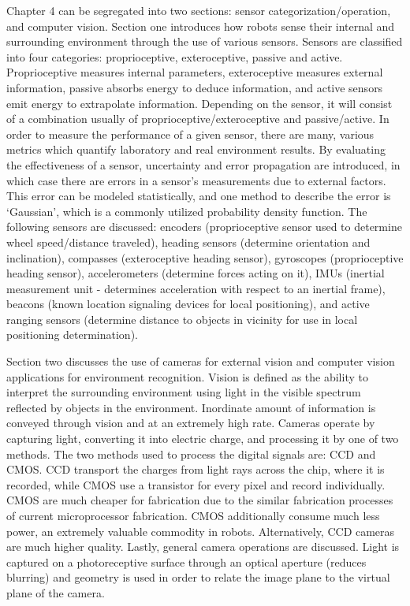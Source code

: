 Chapter 4 can be segregated into two sections: sensor categorization/operation, and computer vision. Section one introduces how robots sense their internal and surrounding environment through the use of various sensors. Sensors are classified into four categories: proprioceptive, exteroceptive, passive and active.  Proprioceptive measures internal parameters, exteroceptive measures external information, passive absorbs energy to deduce information, and active sensors emit energy to extrapolate information. Depending on the sensor, it will consist of a combination usually of proprioceptive/exteroceptive and passive/active. In order to measure the performance of a given sensor, there are many, various metrics which quantify laboratory and real environment results. By evaluating the effectiveness of a sensor, uncertainty and error propagation are introduced, in which case there are errors in a sensor’s measurements due to external factors. This error can be modeled statistically, and one method to describe the error is ‘Gaussian’, which is a commonly utilized probability density function. The following sensors are discussed: encoders (proprioceptive sensor used to determine wheel speed/distance traveled), heading sensors (determine orientation and inclination), compasses (exteroceptive heading sensor), gyroscopes (proprioceptive heading sensor), accelerometers (determine forces acting on it), IMUs (inertial measurement unit - determines acceleration with respect to an inertial frame), beacons (known location signaling devices for local positioning), and active ranging sensors (determine distance to objects in vicinity for use in local positioning determination).

Section two discusses the use of cameras for external vision and computer vision applications for environment recognition. Vision is defined as the ability to interpret the surrounding environment using light in the visible spectrum reflected by objects in the environment. Inordinate amount of information is conveyed through vision and at an extremely high rate. Cameras operate by capturing light, converting it into electric charge, and processing it by one of two methods. The two methods used to process the digital signals are: CCD and CMOS. CCD transport the charges from light rays across the chip, where it is recorded, while CMOS use a transistor for every pixel and record individually. CMOS are much cheaper for fabrication due to the similar fabrication processes of current microprocessor fabrication. CMOS additionally consume much less power, an extremely valuable commodity in robots. Alternatively, CCD cameras are much higher quality. Lastly, general camera operations are discussed. Light is captured on a photoreceptive surface through an optical aperture (reduces blurring) and geometry is used in order to relate the image plane to the virtual plane of the camera.


